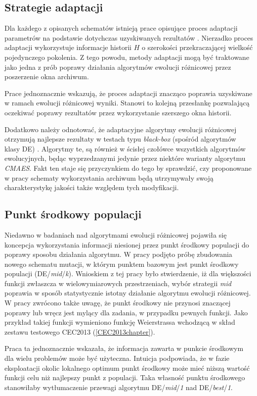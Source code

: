 \documentclass[12pt,a4paper]{report}
\begin{document}
{{{\subsection{Strategie adaptacji}
\label{Adaptation}
\par{
Dla każdego z opisanych schematów istnieją prace opisujące proces adaptacji parametrów na podstawie dotychczas uzyskiwanych rezultatów \cite{zhang2009adaptive,JADE,SHADE}. Nierzadko proces adaptacji wykorzystuje informacje historii $H$ o szerokości przekraczającej wielkość pojedynczego pokolenia. Z tego powodu, metody adaptacji mogą być traktowane jako jedna z prób poprawy działania algorytmów ewolucji różnicowej przez poszerzenie okna archiwum.
}
\par{
Prace \cite{zhang2009adaptive,JADE,SHADE} jednoznacznie wskazują, że proces adaptacji znacząco poprawia uzyskiwane w ramach ewolucji różnicowej wyniki. Stanowi to kolejną przesłankę pozwalającą oczekiwać poprawy rezultatów przez wykorzystanie szerszego okna historii.
}
\par{
Dodatkowo należy odnotować, że adaptacyjne algorytmy ewolucji różnicowej otrzymują najlepsze rezultaty w testach typu \emph{black-box} (spośród algorytmów klasy DE) \cite{CEC2013Comp}. Algorytmy te, są również w ścisłej czołówce wszystkich algorytmów ewolucyjnych, będąc wyprzedzanymi jedynie przez niektóre warianty algorytmu \emph{CMAES}. Fakt ten staje się przyczynkiem do tego by sprawdzić, czy proponowane w pracy schematy wykorzystania archiwum będą utrzymywały swoją charakterystykę jakości także względem tych modyfikacji.
}

\subsection{Punkt środkowy populacji}
\label{MidPoint}
\par{
Niedawno w badaniach nad algorytmami ewolucji różnicowej pojawiła się koncepcja wykorzystania informacji niesionej przez punkt środkowy populacji do poprawy sposobu działania algorytmu. W pracy \cite{DEmid} podjęto próbę zbudowania nowego schematu mutacji, w którym punktem bazowym jest punkt środkowy populacji (DE/\emph{mid}/\emph{k}). Wnioskiem z tej pracy było stwierdzenie, iż dla większości funkcji zwłaszcza w wielowymiarowych przestrzeniach, wybór strategii \emph{mid} poprawia w sposób statystycznie istotny działanie algorytmu ewolucji różnicowej. W pracy zwrócono także uwagę, że punkt środkowy nie przynosi znaczącej poprawy lub wręcz jest mylący dla zadania, w przypadku pewnych funkcji. Jako przykład takiej funkcji wymieniono funkcję Weierstrassa wchodzącą w skład zestawu testowego CEC2013 (\ref{CEC2013chapter}).
}
\par{
Praca ta jednoznacznie wskazała, że informacja zawarta w punkcie środkowym dla wielu problemów może być użyteczna. Intuicja podpowiada, że w fazie eksploatacji okolic lokalnego optimum punkt środkowy może mieć niższą wartość funkcji celu niż najlepszy punkt z populacji. Taka własność punktu środkowego stanowiłaby wytłumaczenie przewagi algorytmu DE/\emph{mid}/\emph{1} nad DE/\emph{best}/\emph{1}.
}
}}}
\end{document}
